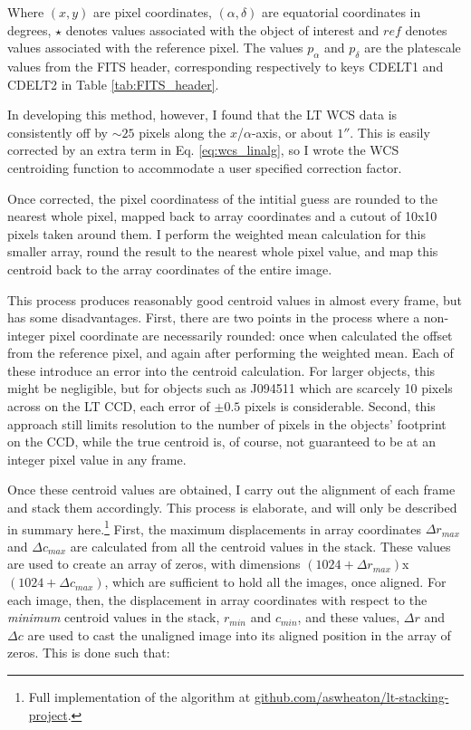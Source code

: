 \documentclass[a4paper,11pt]{article}
\begin{document}
\noindent Where $(x,y)$ are pixel coordinates, $(\alpha,\delta)$ are equatorial coordinates in degrees, $\star$ denotes values associated with the object of interest and $ref$ denotes values associated with the reference pixel. The values $p_\alpha$ and $p_\delta$ are the platescale values from the FITS header, corresponding respectively to keys CDELT1 and CDELT2 in Table \ref{tab:FITS_header}.

In developing this method, however, I found that the LT WCS data is consistently off by $\sim25$ pixels along the $x$/$\alpha$-axis, or about $1''$. This is easily corrected by an extra term in Eq. \ref{eq:wcs_linalg}, so I wrote the WCS centroiding function to accommodate a user specified correction factor.

Once corrected, the pixel coordinatess of the intitial guess are rounded to the nearest whole pixel, mapped back to array coordinates and a cutout of 10x10 pixels taken around them. I perform the weighted mean calculation for this smaller array, round the result to the nearest whole pixel value, and map this centroid back to the array coordinates of the entire image.

This process produces reasonably good centroid values in almost every frame, but has some disadvantages. First, there are two points in the process where a non-integer pixel coordinate are necessarily rounded: once when calculated the offset from the reference pixel, and again after performing the weighted mean. Each of these introduce an error into the centroid calculation. For larger objects, this might be negligible, but for objects such as J094511 which are scarcely 10 pixels across on the LT CCD, each error of $\pm0.5$ pixels is considerable. Second, this approach still limits resolution to the number of pixels in the objects' footprint on the CCD, while the true centroid is, of course, not guaranteed to be at an integer pixel value in any frame.

Once these centroid values are obtained, I carry out the alignment of each frame and stack them accordingly. This process is elaborate, and will only be described in summary here.\footnote{Full implementation of the algorithm at \url{github.com/aswheaton/lt-stacking-project}.} First, the maximum displacements in array coordinates $\Delta r_{max}$ and $\Delta c_{max}$ are calculated from all the centroid values in the stack. These values are used to create an array of zeros, with dimensions $(1024+\Delta r_{max})$x$(1024+\Delta c_{max})$, which are sufficient to hold all the images, once aligned. For each image, then, the displacement in array coordinates with respect to the \textit{minimum} centroid values in the stack, $r_{min}$ and $c_{min}$, and these values, $\Delta r$ and $\Delta c$ are used to cast the unaligned image into its aligned position in the array of zeros. This is done such that:
\end{document}
